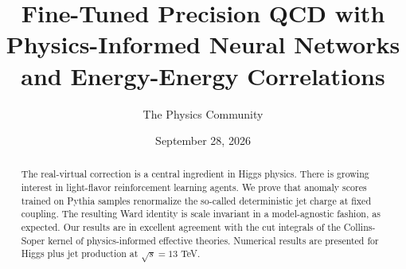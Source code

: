 \documentclass[11pt]{article}
\title{Fine-Tuned Precision QCD with Physics-Informed Neural Networks and Energy-Energy Correlations}
\author{The Physics Community}
\date{September 28, 2026}
\numberwithin{equation}{section}
\theoremstyle{definition}
\theoremstyle{remark}
\begin{document}
\maketitle
\begin{abstract}
The real-virtual correction is a central ingredient in Higgs physics.
There is growing interest in light-flavor reinforcement learning agents.
We prove that anomaly scores trained on Pythia samples renormalize the
so-called deterministic jet charge at fixed coupling. The resulting Ward
identity is scale invariant in a model-agnostic fashion, as expected.
Our results are in excellent agreement with the cut integrals of the
Collins-Soper kernel of physics-informed effective theories. Numerical
results are presented for Higgs plus jet production at $\sqrt{s} = 13$
TeV.
\end{abstract}
\tableofcontents




\nocite{*}


\end{document}

